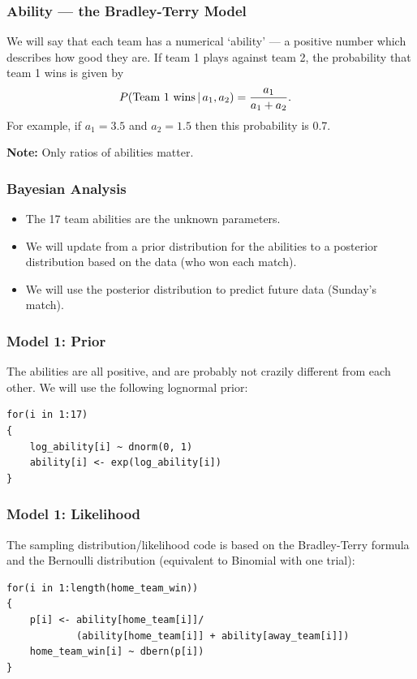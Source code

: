 \documentclass{beamer}
\newcommand{\given}{\,|\,}
\begin{document}
\begin{frame}[fragile]
\frametitle{Ability --- the Bradley-Terry Model}
We will say that each team has a numerical `ability' --- a positive number which
describes how good they are. If team 1 plays against team 2, the probability
that team 1 wins is given by
\begin{align}
P(\textnormal{Team 1 wins} \given a_1, a_2)
    &= \frac{a_1}{a_1 + a_2}.
\end{align}
For example, if $a_1 = 3.5$ and $a_2 = 1.5$ then this probability is 0.7.\pause

{\bf Note:} Only ratios of abilities matter.

\end{frame}

\begin{frame}[fragile]
\frametitle{Bayesian Analysis}
\begin{itemize}
\item The 17 team abilities are the unknown parameters. \pause
\item We will update from a prior distribution for the abilities to a posterior
distribution based on the data (who won each match).\pause
\item We will use the posterior distribution to predict future data (Sunday's
match).
\end{itemize}

\end{frame}


\begin{frame}[fragile]
\frametitle{Model 1: Prior}
The abilities are all positive, and are probably not crazily different from
each other. We will use the following lognormal prior:

\begin{verbatim}
for(i in 1:17)
{
    log_ability[i] ~ dnorm(0, 1)
    ability[i] <- exp(log_ability[i])
}
\end{verbatim}


\end{frame}


\begin{frame}[fragile]
\frametitle{Model 1: Likelihood}
The sampling distribution/likelihood code is based on the Bradley-Terry formula
and the Bernoulli distribution (equivalent to Binomial with one trial):

\begin{verbatim}
for(i in 1:length(home_team_win))
{
    p[i] <- ability[home_team[i]]/
            (ability[home_team[i]] + ability[away_team[i]])
    home_team_win[i] ~ dbern(p[i])
}
\end{verbatim}

\end{frame}
\end{document}
